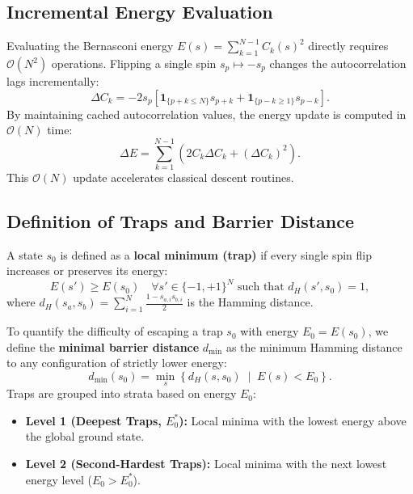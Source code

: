 \documentclass[12pt,a4paper]{report}
\begin{document}
\subsection{Incremental Energy Evaluation}
Evaluating the Bernasconi energy $E(s) = \sum_{k=1}^{N-1} C_k(s)^2$ directly requires $\mathcal{O}(N^2)$ operations. Flipping a single spin $s_p \mapsto -s_p$ changes the autocorrelation lags incrementally:
\begin{equation}
    \Delta C_k = -2 s_p \left[ \mathbf{1}_{\{p+k \le N\}} s_{p+k} + \mathbf{1}_{\{p-k \ge 1\}} s_{p-k} \right].
    \label{eq:delta_ck}
\end{equation}
By maintaining cached autocorrelation values, the energy update is computed in $\mathcal{O}(N)$ time:
\begin{equation}
    \Delta E = \sum_{k=1}^{N-1} \left( 2 C_k \Delta C_k + (\Delta C_k)^2 \right).
    \label{eq:delta_e}
\end{equation}
This $\mathcal{O}(N)$ update accelerates classical descent routines.

\subsection{Definition of Traps and Barrier Distance}
A state $s_0$ is defined as a \textbf{local minimum (trap)} if every single spin flip increases or preserves its energy:
\begin{equation}
    E(s') \ge E(s_0) \quad \forall s' \in \{-1, +1\}^N \text{ such that } d_H(s', s_0) = 1,
\end{equation}
where $d_H(s_a, s_b) = \sum_{i=1}^N \frac{1 - s_{a,i} s_{b,i}}{2}$ is the Hamming distance.

To quantify the difficulty of escaping a trap $s_0$ with energy $E_0 = E(s_0)$, we define the \textbf{minimal barrier distance} $d_{\min}$ as the minimum Hamming distance to any configuration of strictly lower energy:
\begin{equation}
    d_{\min}(s_0) = \min_{s} \left\{ d_H(s, s_0) \;\middle|\; E(s) < E_0 \right\}.
    \label{eq:d_min}
\end{equation}
Traps are grouped into strata based on energy $E_0$:
\begin{itemize}
    \item \textbf{Level 1 (Deepest Traps, $E_0^*$):} Local minima with the lowest energy above the global ground state.
    \item \textbf{Level 2 (Second-Hardest Traps):} Local minima with the next lowest energy level ($E_0 > E_0^*$).
\end{itemize}
\end{document}
